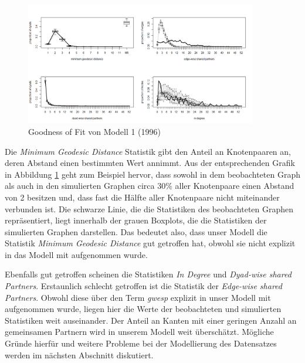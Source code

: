 \documentclass[a4paper,ngerman,oneside,titlepage,bibliography=totoc,11pt]{scrreprt}
\begin{document}
\begin{figure}[ht]
	\centering
		\includegraphics[width=0.9\textwidth]{Grafiken/GOF.png}
	\caption{Goodness of Fit von Modell 1 (1996)}
	\label{fig:gof.model1}
\end{figure}
Die \emph{Minimum Geodesic Distance} Statistik gibt den Anteil an Knotenpaaren an, deren Abstand einen bestimmten Wert annimmt. Aus der entsprechenden Grafik in Abbildung \ref{fig:gof.model1} geht zum Beispiel hervor, dass sowohl in dem beobachteten Graph als auch in den simulierten Graphen circa $30\%$ aller Knotenpaare einen Abstand von 2 besitzen und, dass fast die Hälfte aller Knotenpaare nicht miteinander verbunden ist.  Die schwarze Linie, die die Statistiken des beobachteten Graphen repräsentiert, liegt innerhalb der grauen Boxplots, die die Statistiken der simulierten Graphen darstellen. Das bedeutet also, dass unser Modell die Statistik \emph{Minimum Geodesic Distance} gut getroffen hat, obwohl sie nicht explizit in das Modell mit aufgenommen wurde.

Ebenfalls gut getroffen scheinen die Statistiken \emph{In Degree} und \emph{Dyad-wise shared Partners}. Erstaunlich schlecht getroffen ist die Statistik der \emph{Edge-wise shared Partners}. Obwohl diese über den Term \emph{gwesp} explizit in unser Modell mit aufgenommen wurde, liegen hier die Werte der beobachteten und simulierten Statistiken weit auseinander. Der Anteil an Kanten mit einer geringen Anzahl an gemeinsamen Partnern wird in unserem Modell weit überschätzt. Mögliche Gründe hierfür und weitere Probleme bei der Modellierung des Datensatzes werden im nächsten Abschnitt diskutiert.
\end{document}
